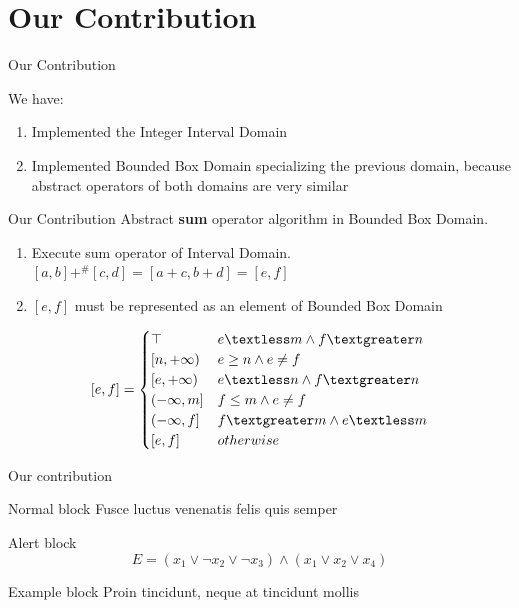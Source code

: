\documentclass{beamer}
\begin{document}
	\section{Our Contribution}
	
	\begin{frame}{Our Contribution}

	
	We have:
	\begin{enumerate}
		\item Implemented the Integer Interval Domain
		\item Implemented Bounded Box Domain specializing the previous domain, because abstract operators of both domains are very similar
	\end{enumerate}
	
	\end{frame}

	\begin{frame}{Our Contribution}
		Abstract \textbf{sum} operator algorithm in Bounded Box Domain. 
		\begin{enumerate}
			\item Execute sum operator of Interval Domain. \\
			$[a,b] +^\# [c,d] = [a + c,b + d] = [e,f]$
			\item $[e,f]$ must be represented as an element of Bounded Box Domain
		\end{enumerate}
	\[ [e,f] =
	\begin{cases} 
	\top & e \textless m \land f \textgreater n\\
	[n,+\infty) & e \geq n  \land  e \neq f\\
	[e,+\infty) & e \textless n \land f \textgreater n\\
	(-\infty,m] & f \leq m \land e \neq f\\
	(-\infty,f] & f \textgreater m \land e \textless m \\
	[e,f] & otherwise
	\end{cases}
	\]
		
	\end{frame}

	\begin{frame}{Our contribution}
		\begin{block}{Normal block}
			Fusce luctus venenatis felis quis semper
		\end{block}

		\begin{alertblock}{Alert block}
			$$ E = (x_1 \vee \neg x_2 \vee \neg x_3) \wedge (x_1 \vee x_2 \vee x_4) $$
		\end{alertblock}

		\begin{exampleblock}{Example block}
			Proin tincidunt, neque at tincidunt mollis
		\end{exampleblock}
	\end{frame}
\end{document}
